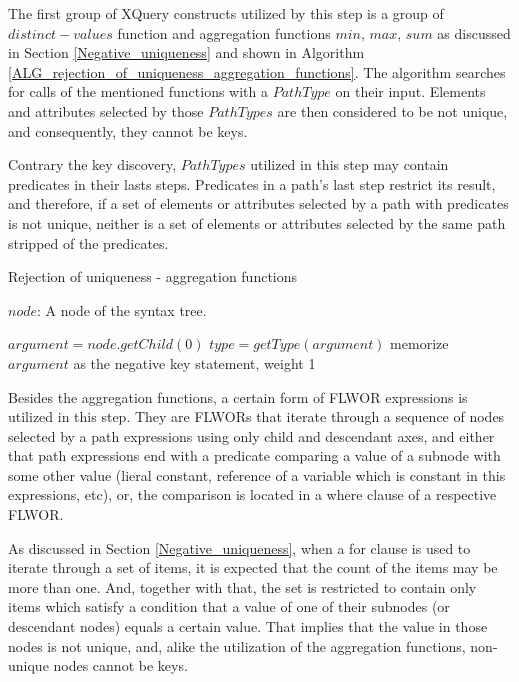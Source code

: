 The first group of XQuery constructs utilized by this step is a group of $distinct-values$ function and aggregation functions $min$, $max$, $sum$ as discussed in Section \ref{Negative_uniqueness} and shown in Algorithm \ref{ALG_rejection_of_uniqueness_aggregation_functions}. The algorithm searches for calls of the mentioned functions with a $PathType$ on their input. Elements and attributes selected by those $PathTypes$ are then considered to be not unique, and consequently, they cannot be keys.

Contrary the key discovery, $PathTypes$ utilized in this step may contain predicates in their lasts steps. Predicates in a path's last step restrict its result, and therefore, if a set of elements or attributes selected by a path with predicates is not unique, neither is a set of elements or attributes selected by the same path stripped of the predicates.

\begin{algorithm}
\caption{Rejection of uniqueness - aggregation functions}
\label{ALG_rejection_of_uniqueness_aggregation_functions}
\begin{algorithmic}[1]
\REQUIRE $node$: A node of the syntax tree.

        \STATE $argument = node.getChild(0)$
        \STATE $type = getType(argument)$
            \STATE memorize $argument$ as the negative key statement, weight 1
        \ENDIF
    \ENDIF
\ENDIF
\end{algorithmic}
\end{algorithm}

Besides the aggregation functions, a certain form of FLWOR expressions is utilized in this step. They are FLWORs that iterate through a sequence of nodes selected by a path expressions using only child and descendant axes, and either that path expressions end with a predicate comparing a value of a subnode with some other value (lieral constant, reference of a variable which is constant in this expressions, etc), or, the comparison is located in a where clause of a respective FLWOR.

As discussed in Section \ref{Negative_uniqueness}, when a for clause is used to iterate through a set of items, it is expected that the count of the items may be more than one. And, together with that, the set is restricted to contain only items which satisfy a condition that a value of one of their subnodes (or descendant nodes) equals a certain value. That implies that the value in those nodes is not unique, and, alike the utilization of the aggregation functions, non-unique nodes cannot be keys.

